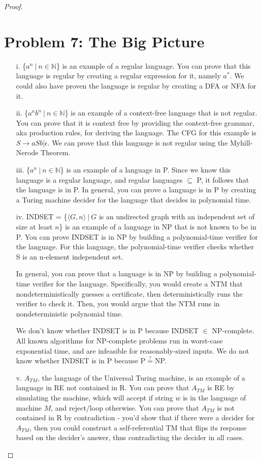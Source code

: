 \documentclass[10pt,letter]{article}
\begin{document}
\begin{proof}
\section*{Problem 7: The Big Picture}
\begin{enumerate}
\item[i.] \{$a^n\ |\ n \in \mathbb{N}$\} is an example of a regular language. You can prove that this language is regular by creating a regular expression for it, namely $a^*$. We could also have proven the language is regular by creating a DFA or NFA for it.
\item[ii.] \{$a^nb^n\ |\ n \in \mathbb{N}$\} is an example of a context-free language that is not regular. You can prove that it is context free by providing the context-free grammar, aka production rules, for deriving the language. The CFG for this example is $S \rightarrow aSb | \epsilon$. We can prove that this language is not regular using the Myhill-Nerode Theorem.
\item[iii.]  \{$a^n\ |\ n \in \mathbb{N}$\} is an example of a language in P. Since we know this language is a regular language, and regular languages $\subseteq$ P, it follows that the language is in P. In general, you can prove a language is in P by creating a Turing machine decider for the language that decides in polynomial time.

\item[iv.] INDSET = \{$\langle G, n \rangle\ |\ G$ is an undirected graph with an independent set of size at least $n$\} is an example of a language in NP that is not known to be in P. You can prove INDSET is in NP by building a polynomial-time verifier for the language. For this language, the polynomial-time verifier checks whether S is an n-element independent set.

In general, you can prove that a language is in NP by building a polynomial-time verifier for the language. Specifically, you would create a NTM that nondeterministically guesses a certificate, then deterministically runs the verifier to check it. Then, you would argue that the NTM runs in nondeterministic polynomial time. 

We don't know whether INDSET is in P because INDSET $\in$ NP-complete. All known algorithms for NP-complete problems run in worst-case exponential time, and are infeasible for reasonably-sized inputs. We do not know whether INDSET is in P because P$\stackrel{?}{=}$NP.

\item[v.] $A_{TM}$, the language of the Universal Turing machine, is an example of a language in RE not contained in R. You can prove that $A_{TM}$ is RE by simulating the machine, which will accept if string $w$ is in the language of machine $M$, and reject/loop otherwise. You can prove that $A_{TM}$ is not contained in R by contradiction - you'd show that if there were a decider for $A_{TM}$, then you could construct a self-referential TM that flips its response based on the decider's answer, thus contradicting the decider in all cases.


\end{enumerate}
\end{proof}
\end{document}
